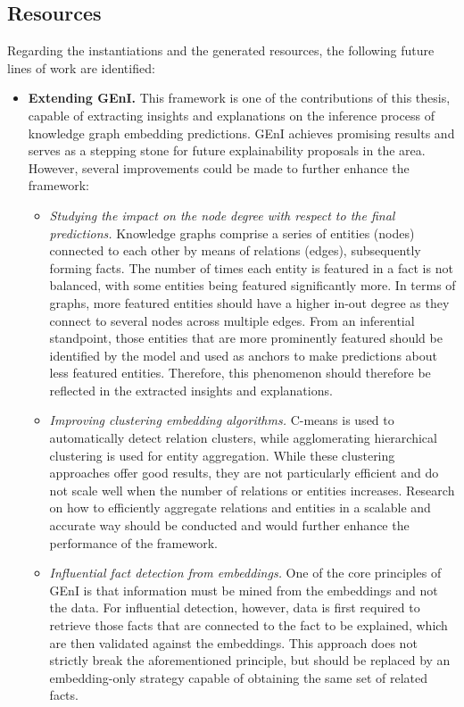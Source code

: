 

\subsection*{Resources}
Regarding the instantiations and the generated resources, the following future lines of work are identified:
\begin{itemize}
    \item \textbf{Extending GEnI.} This framework is one of the contributions of this thesis, capable of extracting insights and explanations on the inference process of knowledge graph embedding predictions. GEnI achieves promising results and serves as a stepping stone for future explainability proposals in the area. However, several improvements could be made to further enhance the framework:
    \begin{itemize}
        \item \textit{Studying the impact on the node degree with respect to the final predictions.} Knowledge graphs comprise a series of entities (nodes) connected to each other by means of relations (edges), subsequently forming facts. The number of times each entity is featured in a fact is not balanced, with some entities being featured significantly more. In terms of graphs, more featured entities should have a higher in-out degree as they connect to several nodes across multiple edges. From an inferential standpoint, those entities that are more prominently featured should be identified by the model and used as anchors to make predictions about less featured entities. Therefore, this phenomenon should therefore be reflected in the extracted insights and explanations.
        \item \textit{Improving clustering embedding algorithms.} C-means is used to automatically detect relation clusters, while agglomerating hierarchical clustering is used for entity aggregation. While these clustering approaches offer good results, they are not particularly efficient and do not scale well when the number of relations or entities increases. Research on how to efficiently aggregate relations and entities in a scalable and accurate way should be conducted and would further enhance the performance of the framework.
        \item \textit{Influential fact detection from embeddings.} One of the core principles of GEnI is that information must be mined from the embeddings and not the data. For influential detection, however, data is first required to retrieve those facts that are connected to the fact to be explained, which are then validated against the embeddings. This approach does not strictly break the aforementioned principle, but should be replaced by an embedding-only strategy capable of obtaining the same set of related facts. 

\end{itemize}
\end{itemize}
